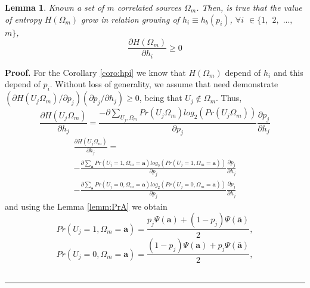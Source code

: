 \documentclass[a4paper,10pt]{article}
\newtheorem{mylemma}[mytheorem]{Lemma}
\newenvironment{myproof}[1][Proof]{\textbf{#1.} }{\ \rule{0.5em}{0.5em}}
\begin{document}
\begin{mdframed}[style=MDFStyGrayScreen]
\begin{mylemma}
 \label{lemm:dH}
Known a set of $m$ correlated  sources  $\Omega_m$. Then, is true that
the value of entropy $H(\Omega_m)$ grow in relation growing of $h_i \equiv h_{b}(p_i)$, 
$\forall i$ $\in \{1,$ $2,$ $...,$ $m\}$,
\begin{equation}\label{eq:dH1}
 \frac{\partial H(\Omega_m)}{\partial h_i} \geq 0
\end{equation}
\end{mylemma}
\end{mdframed}

\begin{myproof}
 \label{proof:dH} 
For the Corollary \ref{coro:hpi} we know that $H(\Omega_m)$ depend of $h_i$
and this depend of $p_i$. Without loss of generality, 
we assume that need demonstrate
$({\partial H(U_j\Omega_{m})}/{\partial p_j}) ({\partial p_j}/{\partial h_j}) \geq 0$,
being that $U_j \notin \Omega_{m}$. Thus,
\small
\begin{equation}\label{eq:dH2}
 \frac{\partial H(U_j\Omega_{m})}{\partial h_j} =\frac{-\partial \sum \limits_{U_j,\Omega_{m}} Pr(U_j\Omega_{m}) log_2(Pr(U_j\Omega_{m}))}{\partial p_j}\frac{\partial p_j}{\partial h_j} 
\end{equation}
\normalsize
\begin{equation}\label{eq:dH21}
\begin{matrix}
\frac{\partial H(U_j\Omega_{m})}{\partial h_j} =\\
-\frac{\partial \sum \limits_{\mathbf{a}} Pr(U_j=1,\Omega_{m}=\mathbf{a}) log_2(Pr(U_j=1,\Omega_{m}=\mathbf{a}))}{\partial p_j}\frac{\partial p_j}{\partial h_j}  \\
-\frac{\partial \sum \limits_{\mathbf{a}} Pr(U_j=0,\Omega_{m}=\mathbf{a}) log_2(Pr(U_j=0,\Omega_{m}=\mathbf{a}))}{\partial p_j}\frac{\partial p_j}{\partial h_j}
\end{matrix}
\end{equation}
and using the Lemma \ref{lemm:PrA} we obtain
\begin{equation}\label{eq:dH3}
 Pr(U_j=1,\Omega_{m}=\mathbf{a})=\frac{ p_j\Psi(\mathbf{a}) + (1-p_j)\Psi(\mathbf{\bar{a}}) }{2},
\end{equation}
\begin{equation}\label{eq:dH4}
 Pr(U_j=0,\Omega_{m}=\mathbf{a})=\frac{ (1-p_j)\Psi(\mathbf{a}) + p_j\Psi(\mathbf{\bar{a}}) }{2},

\end{equation}
\end{myproof}
\end{document}

